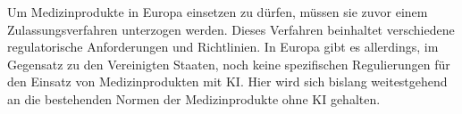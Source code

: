 Um Medizinprodukte in Europa einsetzen zu dürfen, müssen sie zuvor einem Zulassungsverfahren unterzogen werden.
Dieses Verfahren beinhaltet verschiedene regulatorische Anforderungen und Richtlinien.
In Europa gibt es allerdings, im Gegensatz zu den Vereinigten Staaten, 
noch keine spezifischen Regulierungen für den Einsatz von Medizinprodukten mit KI.
Hier wird sich bislang weitestgehend an die bestehenden Normen der Medizinprodukte ohne KI gehalten.
